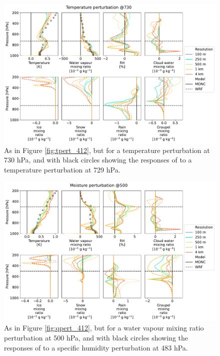 \documentclass[draft]{agujournal2019}
\begin{document}
\begin{figure}[pth]
    \noindent\includegraphics[width=\textwidth]{figures/pert_diffs_T_0.5_@730}
    \caption{As in Figure \ref{fig:tpert_412}, but for a temperature
    perturbation at 730 hPa, and with black circles showing the responses of
     to a temperature perturbation at 729 hPa.}
    \label{fig:tpert_730}
\end{figure}

\begin{figure}[pth]
    \noindent\includegraphics[width=\textwidth]{figures/pert_diffs_q_0.0002_@500}
    \caption{As in Figure \ref{fig:qpert_412}, but for a water vapour mixing
    ratio perturbation at 500 hPa, and with black circles showing the responses
    of  to a specific humidity perturbation at 483
    hPa.}
    \label{fig:qpert_500}
\end{figure}
\end{document}
